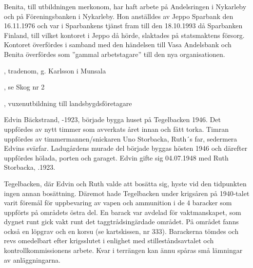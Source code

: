 Benita, till utbildningen merkonom, har haft arbete på Andelsringen i Nykarleby och på Föreningsbanken i Nykarleby.  Hon anställdes av Jeppo Sparbank den 16.11.1976 och var i Sparbankens tjänst fram till den 18.10.1993 då Sparbanken Finland, till vilket kontoret i Jeppo då hörde, slaktades på statsmaktens försorg. Kontoret överfördes i samband med den händelsen till Vasa Andelsbank och Benita överfördes som ”gammal arbetstagare” till den nya organisationen.
\begin{jhchildren}
  \item {}, tradenom, g. Karlsson i Munsala
  \item {}, se Skog nr 2
  \item {}, vuxenutbildning till landsbygdsföretagare
\end{jhchildren}


%
Edvin Bäckstrand, -1923, började bygga huset på Tegelbacken 1946. Det uppfördes av nytt timmer som avverkats året innan och fått torka. Timran uppfördes av timmermannen/snickaren Uno Storbacka, Ruth´s far, sedermera Edvins svärfar. Ladugårdens murade del började byggas hösten 1946 och därefter uppfördes hölada, porten och garaget. Edvin gifte sig 04.07.1948 med Ruth Storbacka,  .1923.
\begin{jhchildren}
  \item {}
  \item {}
\end{jhchildren}

Tegelbacken, där Edvin och Ruth valde att bosätta sig, hyste vid den tidpunkten ingen annan bosättning. Däremot hade Tegelbacken under krigsåren på 1940-talet varit föremål för uppbevaring av vapen och ammunition i de 4 baracker som uppförts på områdets östra del. En barack var avdelad för vaktmanskapet, som dygnet runt gick vakt runt det taggtrådsingärdade området. På området fanns också en löpgrav och en korsu (se kartskissen, nr 333). Barackerna tömdes och revs omedelbart efter krigsslutet i enlighet med stilleståndsavtalet och kontrollkommissionens arbete. Kvar i terrängen kan ännu spåras små lämningar av anläggningarna.

